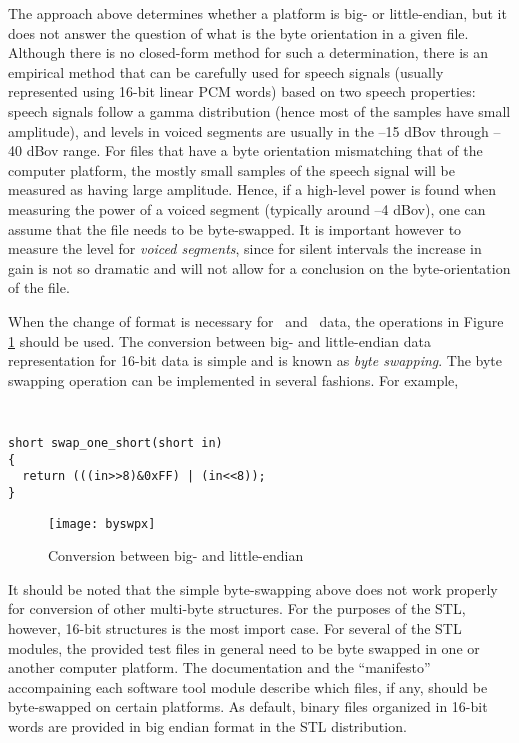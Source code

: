 The approach above determines whether a platform is big- or
little-endian, but it does not answer the question of what is the byte
orientation in a given file. Although there is no closed-form method
for such a determination, there is an empirical method that can be
carefully used for speech signals (usually represented using 16-bit
linear PCM words) based on two speech properties: speech signals
follow a gamma distribution (hence most of the samples have small
amplitude), and levels in voiced segments are usually in the --15 dBov
through --40 dBov range. For files that have a byte orientation
mismatching that of the computer platform, the mostly small samples of
the speech signal will be measured as having large amplitude. Hence,
if a high-level power is found when measuring the power of a voiced
segment (typically around --4 dBov), one can assume that the file
needs to be byte-swapped. It is important however to measure the level
for {\em voiced segments}, since for silent intervals the increase in
gain is not so dramatic and will not allow for a conclusion on the
byte-orientation of the file.

When the change of format is necessary for \short\ and \long\ data,
the operations in Figure \ref{fig:cvt-big-ltl-end} should be used.
The conversion between big- and little-endian data representation for
16-bit data is simple and is known as {\em byte swapping}. The byte
swapping operation can be implemented in several fashions. For
example,
{\tt\small
\begin{verbatim}
short swap_one_short(short in)
{
  return (((in>>8)&0xFF) | (in<<8));
}
\end{verbatim}
}

\begin{figure}[htb]
    \begin{center}
    \texttt{[image: byswpx]}
  \end{center}
  \caption{Conversion between big- and little-endian
           \label{fig:cvt-big-ltl-end}}
\end{figure}

It should be noted that the simple byte-swapping above does not work
properly for conversion of other multi-byte structures. For the
purposes of the STL, however, 16-bit structures is the most import
case. For several of the STL modules, the provided test files in
general need to be byte swapped in one or another computer
platform. The documentation and the ``manifesto'' accompaining each
software tool module describe which files, if any, should be
byte-swapped on certain platforms. As default, binary files organized
in 16-bit words are provided in big endian format in the STL
distribution.


